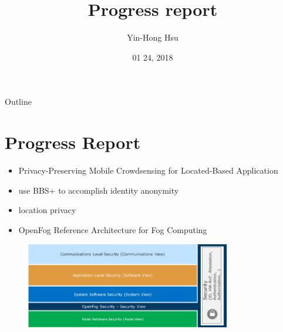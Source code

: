 \documentclass{beamer}
\title {
    Progress report
}
\author {
    Yin-Hong Hsu
}
\date {
    01 24, 2018
}
\begin{document}
\begin{frame}
    \titlepage
\end{frame}


\begin{frame}{Outline}
    \tableofcontentsgather
    \tableofcontents
\end{frame}

\section{Progress Report}
\begin{frame}{}
    \begin{itemize}
        \item {{Privacy-Preserving Mobile Crowdsensing for Located-Based Application}\cite{7997116}}
        \item {use BBS+\cite{6355604} to accomplish identity anonymity}
        \item {location privacy}
    \end{itemize}
\end{frame}
\begin{frame}{}
    \begin{itemize}
        \item {OpenFog Reference Architecture for Fog Computing\cite{openfog}}
    \end{itemize}
\end{frame}
\begin{frame}{}
    \begin{figure}[t]
        \centering
        \includegraphics[width=0.8\textwidth]{figures/fog_security.png}
        
    \end{figure}
\end{frame}
\end{document}
